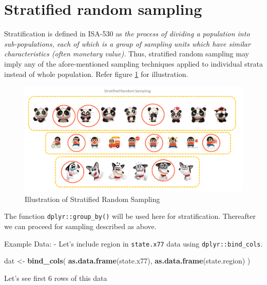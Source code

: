 \documentclass[
]{book}
\newenvironment{Shaded}{\begin{snugshade}}{\end{snugshade}}
\newcommand{\FunctionTok}[1]{\textcolor[rgb]{0.13,0.29,0.53}{\textbf{#1}}}
\newcommand{\NormalTok}[1]{#1}
\newcommand{\OtherTok}[1]{\textcolor[rgb]{0.56,0.35,0.01}{#1}}
\begin{document}
\hypertarget{stratified-random-sampling}{%
\section{Stratified random sampling}\label{stratified-random-sampling}}

Stratification is defined in ISA-530 as \emph{the process of dividing a population into sub-populations, each of which is a group of sampling units which have similar characteristics (often monetary value).} Thus, stratified random sampling may imply any of the afore-mentioned sampling techniques applied to individual strata instead of whole population. Refer figure \ref{fig:strata} for illustration.

\begin{figure}

{\centering \includegraphics[width=0.99\linewidth]{images/stratified} 

}

\caption{Illustration of Stratified Random Sampling}\label{fig:strata}
\end{figure}

The function \texttt{dplyr::group\_by()} will be used here for stratification. Thereafter we can proceed for sampling described as above.

Example Data: - Let's include region in \texttt{state.x77} data using \texttt{dplyr::bind\_cols}.

\begin{Shaded}
\begin{Highlighting}[]
\NormalTok{dat }\OtherTok{\textless{}{-}} \FunctionTok{bind\_cols}\NormalTok{(}
  \FunctionTok{as.data.frame}\NormalTok{(state.x77),}
  \FunctionTok{as.data.frame}\NormalTok{(state.region)}
\NormalTok{)}
\end{Highlighting}
\end{Shaded}

Let's see first 6 rows of this data
\end{document}
